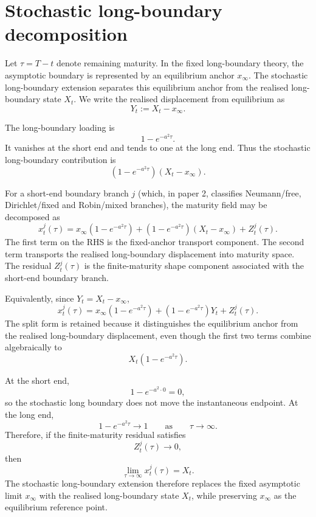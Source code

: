 \documentclass[11pt]{article}
\numberwithin{equation}{section}
\begin{document}
\section{Stochastic long-boundary decomposition}

Let \(\tau=T-t\) denote remaining maturity. In the fixed long-boundary theory, the asymptotic boundary is represented by an equilibrium anchor \(x_\infty\). The stochastic long-boundary extension separates this equilibrium anchor from the realised long-boundary state \(X_t\). We write the realised displacement from equilibrium as
\[
Y_t:=X_t-x_\infty.
\]

The long-boundary loading is
\[
1-e^{-a^2\tau}.
\]
It vanishes at the short end and tends to one at the long end. Thus the stochastic long-boundary contribution is
\[
\left(1-e^{-a^2\tau}\right)(X_t-x_\infty).
\]

For a short-end boundary branch \(j\) (which, in paper 2, classifies Neumann/free, Dirichlet/fixed and Robin/mixed branches),  the maturity field may be decomposed as
\begin{equation}
\label{eq:boundary-decomposition}
x_t^j(\tau)
=
x_\infty\left(1-e^{-a^2\tau}\right)
+
\left(1-e^{-a^2\tau}\right)(X_t-x_\infty)
+
Z_t^j(\tau).
\end{equation}
The first term on the RHS is the fixed-anchor transport component. The second term transports the realised long-boundary displacement into maturity space. The residual \(Z_t^j(\tau)\) is the finite-maturity shape component associated with the short-end boundary branch.

Equivalently, since \(Y_t=X_t-x_\infty\),
\[
x_t^j(\tau)
=
x_\infty\left(1-e^{-a^2\tau}\right)
+
\left(1-e^{-a^2\tau}\right)Y_t
+
Z_t^j(\tau).
\]
The split form is retained because it distinguishes the equilibrium anchor from the realised long-boundary displacement, even though the first two terms combine algebraically to
\[
X_t\left(1-e^{-a^2\tau}\right).
\]

At the short end,
\[
1-e^{-a^2\cdot 0}=0,
\]
so the stochastic long boundary does not move the instantaneous endpoint. At the long end,
\[
1-e^{-a^2\tau}\to1
\qquad
\text{as}
\qquad
\tau\to\infty.
\]
Therefore, if the finite-maturity residual satisfies
\[
Z_t^j(\tau)\to0,
\]
then
\[
\lim_{\tau\to\infty}x_t^j(\tau)=X_t.
\]
The stochastic long-boundary extension therefore replaces the fixed asymptotic limit \(x_\infty\) with the realised long-boundary state \(X_t\), while preserving \(x_\infty\) as the equilibrium reference point.
\end{document}
